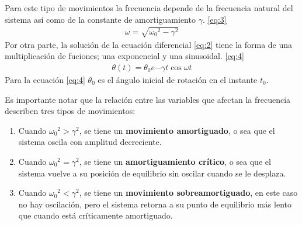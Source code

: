 \documentclass[spanish,notitlepage,letterpaper, 12pt]{article}
\begin{document}
\bigskip
Para este tipo de movimientos la frecuencia depende de la frecuencia natural del sistema así como de la constante de amortiguamiento $\gamma$. \eqref{eq:3}
\begin{align}\label{eq:3}
    \omega=\sqrt{{\omega_0}^2-\gamma^2}
\end{align}
Por otra parte, la solución de la ecuación diferencial \eqref{eq:2} tiene la forma de una multiplicación de fuciones; una exponencial y una sinusoidal. \eqref{eq:4}
\begin{align}\label{eq:4}
    \theta(t)=\theta_0e{-\gamma t}\cos{\omega t}
\end{align}
Para la ecuación \eqref{eq:4} $\theta_0$ es el ángulo inicial de rotación en el instante $t_0$.\par
\bigskip
Es importante notar que la relación entre las variables que afectan la frecuencia describen tres tipos de movimientos:
\begin{enumerate}
    \item Cuando ${\omega_0}^2>\gamma^2$, se tiene un \textbf{movimiento amortiguado}, o sea que el sistema oscila con amplitud decreciente.
    \item Cuando ${\omega_0}^2=\gamma^2$, se tiene un \textbf{amortiguamiento crítico}, o sea que el sistema vuelve a su posición de equilibrio sin oscilar cuando se le desplaza.
    \item Cuando ${\omega_0}^2<\gamma^2$, se tiene un \textbf{movimiento sobreamortiguado}, en este caso no hay oscilación, pero el sistema retorna a su punto de equilibrio más lento que cuando está críticamente amortiguado.
\end{enumerate}
\end{document}
